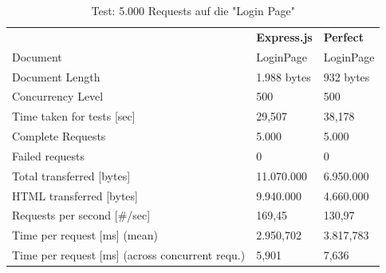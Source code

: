 \begin{table}[H]
\begin{center}
\begin{tabular}{p{8cm}p{2.5cm}p{2.5cm}}
\rowcolor{gray20}														& \textbf{Express.js}	  		& \textbf{Perfect}		\\ 
\rowcolor{gray5}		Document 											& LoginPage					& LoginPage			\\ 
\rowcolor{gray20}	Document Length										& 1.988 bytes				& 932 bytes			\\ 
\rowcolor{gray5}		Concurrency Level									& 500						& 500				\\ 
\rowcolor{gray20}	Time taken for tests [sec]								& 29,507					& 38,178			\\ 
\rowcolor{gray5}		Complete Requests									& 5.000						& 5.000				\\
\rowcolor{gray20}	Failed requests										& 0							& 0					\\ 
\rowcolor{gray5}		Total transferred [bytes]								& 11.070.000				& 6.950.000 			\\ 
\rowcolor{gray20}	HTML transferred	[bytes]								& 9.940.000					& 4.660.000			\\ 
\rowcolor{gray5}		Requests per second [\#/sec]							& 169,45					& 130,97			\\ 
\rowcolor{gray20}	Time per request [ms]	 (mean)							& 2.950,702					& 3.817,783			\\
\rowcolor{gray5}		Time per request [ms]	 (across concurrent requ.)			& 5,901						& 7,636				\\ 
\end{tabular}
\caption{Test: 5.000 Requests auf die "Login Page"} \label{tab:fivethousandrequests}
\end{center}
\end{table}

